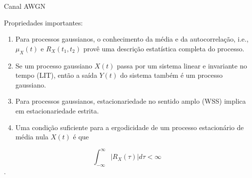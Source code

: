 \documentclass[
  ignorenonframetext,
]{beamer}
\begin{document}
\begin{frame}{Canal AWGN}
\begin{block}{Propriedades importantes:}
\label{propriedades-importantes}
\begin{enumerate}
\item
  Para processos gaussianos, o conhecimento da média e da
  autocorrelação, i.e., \(\mu_X(t)\) e \(R_X(t_1, t_2)\) provê uma
  descrição estatística completa do processo.
\item
  Se um processo gaussiano \(X(t)\) passa por um sistema linear e
  invariante no tempo (LIT), então a saída \(Y(t)\) do sistema também é
  um processo gaussiano.
\item
  Para processos gaussianos, estacionariedade no sentido amplo (WSS)
  implica em estacionariedade estrita.
\item
  Uma condição suficiente para a ergodicidade de um processo
  estacionário de média nula \(X(t)\) é que
\end{enumerate}

\[\int_{-\infty}^{\infty}\left|R_X(\tau)\right| d \tau<\infty\].
\end{block}
\end{frame}
\end{document}
